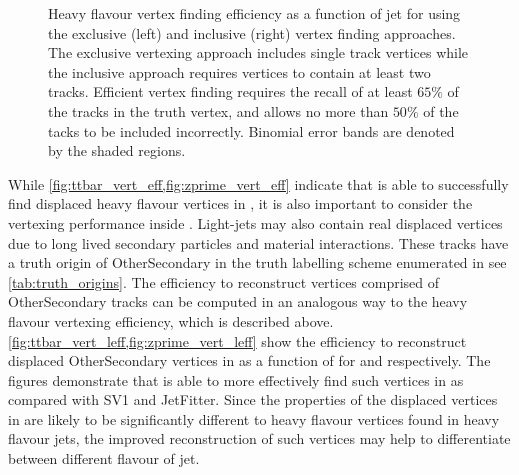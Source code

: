 \begin{figure}[!htbp]
\begin{subfigure}[b]{0.48\textwidth}
    \end{subfigure}
    \caption{
        Heavy flavour vertex finding efficiency as a function of jet \pt for \Zprimebjets using the exclusive (left) and inclusive (right) vertex finding approaches.
        The exclusive vertexing approach includes single track vertices while the inclusive approach requires vertices to contain at least two tracks.
        Efficient vertex finding requires the recall of at least $65\%$ of the tracks in the truth vertex, and allows no more than $50\%$ of the tacks to be included incorrectly.
        Binomial error bands are denoted by the shaded regions.
        }
    \label{fig:zprime_vert_eff}
\end{figure}



While \cref{fig:ttbar_vert_eff,fig:zprime_vert_eff} indicate that \GNN is able to successfully find displaced heavy flavour vertices in \bjets, it is also important to consider the vertexing performance inside \ljets.
Light-jets may also contain real displaced vertices due to long lived secondary particles and material interactions.
These tracks have a truth origin of OtherSecondary in the truth labelling scheme enumerated in see \cref{tab:truth_origins}.
The efficiency to reconstruct vertices comprised of OtherSecondary tracks can be computed in an analogous way to the heavy flavour vertexing efficiency, which is described above.
\cref{fig:ttbar_vert_leff,fig:zprime_vert_leff} show the efficiency to reconstruct displaced OtherSecondary vertices in \ljets as a function of \pt for \ttbarjets and \Zprimejets respectively.
The figures demonstrate that \GNN is able to more effectively find such vertices in \ljets as compared with SV1 and JetFitter.
Since the properties of the displaced vertices in \ljets are likely to be significantly different to heavy flavour vertices found in heavy flavour jets, the improved reconstruction of such vertices may help to differentiate between different flavour of jet.

